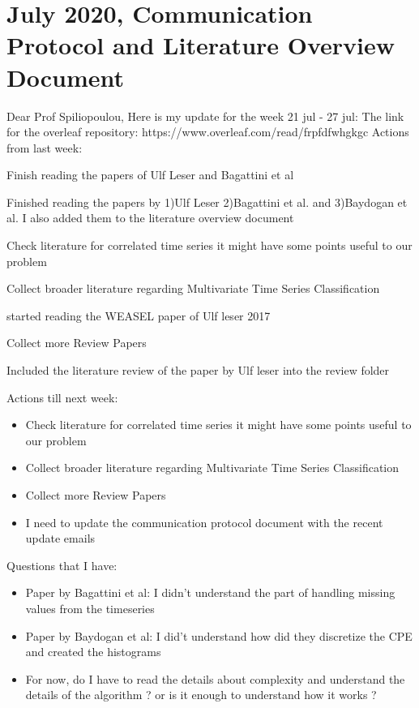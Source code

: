 \documentclass{article}
\newcommand{\cmark}{\ding{51}}%
\newcommand{\done}{\rlap{$\square$}{\raisebox{2pt}{\large\hspace{1pt}\cmark}}%
\hspace{-2.5pt}}
\begin{document}
\section*{\texorpdfstring{}. July 2020, Communication Protocol and Literature Overview Document}
Dear Prof Spiliopoulou,
Here is my update for the week 21 jul - 27 jul:
The link for the overleaf repository: https://www.overleaf.com/read/frpfdfwhgkgc
Actions from last week:
 \begin{todolist}
		\item [\done] Finish reading the papers of Ulf Leser and Bagattini et al
		\begin{todolist}
			\item [\done] Finished reading the papers by 1)Ulf Leser 2)Bagattini et al. and 3)Baydogan et al. I also added them to the literature overview document
		\end{todolist}
		\item Check literature for correlated time series it might have some points useful to our problem
		\item [\done] Collect broader literature regarding Multivariate Time Series Classification
			\begin{todolist}
				\item [\done] started reading the WEASEL paper of Ulf leser 2017
			\end{todolist}
		\item [\done] Collect more Review Papers
			\begin{todolist}
				\item [\done] Included the literature review of the paper by Ulf leser into the review folder
			\end{todolist}
\end{todolist}

Actions till next week:
\begin{itemize}
	\item Check literature for correlated time series it might have some points useful to our problem
	\item Collect broader literature regarding Multivariate Time Series Classification
	\item Collect more Review Papers
	\item I need to update the communication protocol document with the recent update emails
\end{itemize}

Questions that I have:
\begin{itemize}
	\item Paper by Bagattini et al: I didn't understand the part of handling missing values from the timeseries
	\item Paper by Baydogan et al: I did't understand how did they discretize the CPE and created the histograms
	\item For now, do I have to read the details about complexity and understand the details of the algorithm ? or is it enough to understand how it works ?
\end{itemize}
\end{document}
